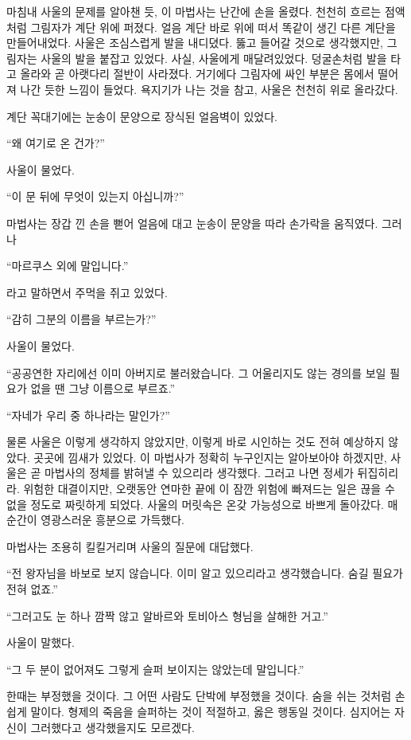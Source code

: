 마침내 사울의 문제를 알아챈 듯, 이 마법사는 난간에 손을 올렸다. 천천히 흐르는 점액처럼 그림자가 계단 위에 퍼졌다. 얼음 계단 바로 위에 떠서 똑같이 생긴 다른 계단을 만들어내었다. 사울은 조심스럽게 발을 내디뎠다. 뚫고 들어갈 것으로 생각했지만, 그림자는 사울의 발을 붙잡고 있었다. 사실, 사울에게 매달려있었다. 덩굴손처럼 발을 타고 올라와 곧 아랫다리 절반이 사라졌다. 거기에다 그림자에 싸인 부분은 몸에서 떨어져 나간 듯한 느낌이 들었다. 욕지기가 나는 것을 참고, 사울은 천천히 위로 올라갔다.

계단 꼭대기에는 눈송이 문양으로 장식된 얼음벽이 있었다.

``왜 여기로 온 건가?''

사울이 물었다.

``이 문 뒤에 무엇이 있는지 아십니까?''

마법사는 장갑 낀 손을 뻗어 얼음에 대고 눈송이 문양을 따라 손가락을 움직였다. 그러나

``마르쿠스 외에 말입니다.''

라고 말하면서 주먹을 쥐고 있었다.

``감히 그분의 이름을 부르는가?''

사울이 물었다.

``공공연한 자리에선 이미 아버지로 불러왔습니다. 그 어울리지도 않는 경의를 보일 필요가 없을 땐 그냥 이름으로 부르죠.''

``자네가 우리 중 하나라는 말인가?''

물론 사울은 이렇게 생각하지 않았지만, 이렇게 바로 시인하는 것도 전혀 예상하지 않았다. 곳곳에 낌새가 있었다. 이 마법사가 정확히 누구인지는 알아보아야 하겠지만, 사울은 곧 마법사의 정체를 밝혀낼 수 있으리라 생각했다. 그러고 나면 정세가 뒤집히리라. 위험한 대결이지만, 오랫동안 연마한 끝에 이 잠깐 위험에 빠져드는 일은 끊을 수 없을 정도로 짜릿하게 되었다. 사울의 머릿속은 온갖 가능성으로 바쁘게 돌아갔다. 매 순간이 영광스러운 흥분으로 가득했다.

마법사는 조용히 킬킬거리며 사울의 질문에 대답했다.

``전 왕자님을 바보로 보지 않습니다. 이미 알고 있으리라고 생각했습니다. 숨길 필요가 전혀 없죠.''

``그러고도 눈 하나 깜짝 않고 알바르와 토비아스 형님을 살해한 거고.''

사울이 말했다.

``그 두 분이 없어져도 그렇게 슬퍼 보이지는 않았는데 말입니다.''

한때는 부정했을 것이다. 그 어떤 사람도 단박에 부정했을 것이다. 숨을 쉬는 것처럼 손쉽게 말이다. 형제의 죽음을 슬퍼하는 것이 적절하고, 옳은 행동일 것이다. 심지어는 자신이 그러했다고 생각했을지도 모르겠다.

